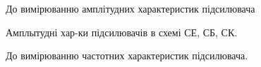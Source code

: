 \documentclass[a4paper,14pt]{extreport}
\begin{document}
\clearpage
\begin{figure}[h]
До вимірюванню амплітудних характеристик підсилювача
\label{ris3}
\end{figure}

\begin{figure}[h]
\label{ris31}
\caption{Амплытудні хар-ки підсилювачів в схемі СЕ, СБ, СК.}
\end{figure}


\begin{figure}[h]
До вимірюванню частотних характеристик підсилювача.
\label{ris4}
\end{figure}
\end{document}
